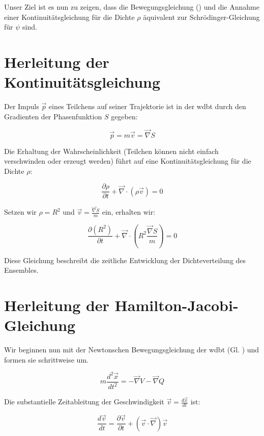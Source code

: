 Unser Ziel ist es nun zu zeigen, dass die Bewegungsgleichung () und die Annahme einer Kontinuitätsgleichung für die Dichte $\rho$ äquivalent zur
Schrödinger-Gleichung für $\psi$ sind.

\section{Herleitung der Kontinuitätsgleichung}
Der Impuls $\vec{p}$ eines Teilchens auf seiner Trajektorie ist in der \gls{wdbt} durch den Gradienten der Phasenfunktion $S$ gegeben:

\begin{equation}
    \label{eq:impuls}
    \vec{p} = m \vec{v} = \vec{\nabla} S
\end{equation}

Die Erhaltung der Wahrscheinlichkeit (Teilchen können nicht einfach verschwinden oder erzeugt werden) führt auf eine Kontinuitätsgleichung für die Dichte $\rho$:

\begin{equation}
    \frac{\partial \rho}{\partial t} + \vec{\nabla} \cdot (\rho \vec{v}) = 0
\end{equation}

Setzen wir $\rho = R^2$ und $\vec{v} = \frac{\vec{\nabla} S}{m}$ ein, erhalten wir:

\begin{equation}
    \frac{\partial (R^2)}{\partial t} + \vec{\nabla} \cdot \left( R^2 \frac{\vec{\nabla} S}{m} \right) = 0
\end{equation}

Diese Gleichung beschreibt die zeitliche Entwicklung der Dichteverteilung des Ensembles.

\section{Herleitung der Hamilton-Jacobi-Gleichung}
Wir beginnen nun mit der Newtonschen Bewegungsgleichung der \gls{wdbt} (Gl. ) und formen sie schrittweise um.

\begin{equation}
    m \frac{d^2\vec{x}}{dt^2} = -\vec{\nabla} V - \vec{\nabla} Q \tag{3.1}
\end{equation}

Die substantielle Zeitableitung der Geschwindigkeit $\vec{v} = \frac{d \vec{x}}{dt}$ ist:

\begin{equation}
    \frac{d\vec{v}}{dt} = \frac{\partial \vec{v}}{\partial t} + (\vec{v} \cdot \vec{\nabla}) \vec{v}
\end{equation}

